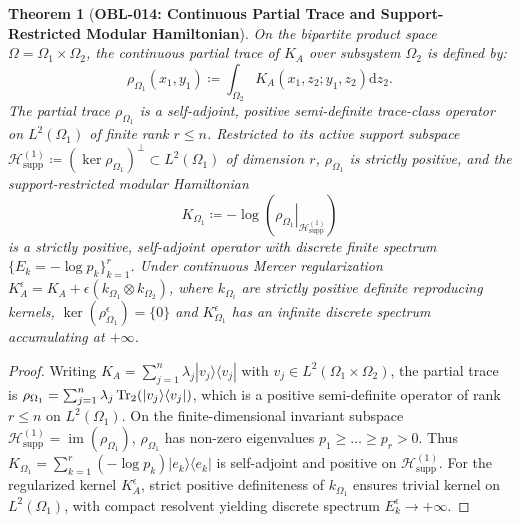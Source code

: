 \documentclass[11pt,a4paper,reqno]{amsart}
\newtheorem{theorem}{Theorem}[section]
\theoremstyle{definition}
\theoremstyle{remark}
\numberwithin{equation}{section}
\newcommand{\dif}{\mathrm{d}}
\DeclareMathOperator{\im}{im}
\begin{document}
\begin{theorem}[\textbf{OBL-014: Continuous Partial Trace and Support-Restricted Modular Hamiltonian}]
\label{thm:modular_hamiltonian_spec}
On the bipartite product space $\Omega = \Omega_1 \times \Omega_2$, the continuous partial trace of $K_A$ over subsystem $\Omega_2$ is defined by:
\begin{equation}
\rho_{\Omega_1}(x_1, y_1) \coloneqq \int_{\Omega_2} K_A(x_1, z_2; y_1, z_2) \dif z_2.
\end{equation}
The partial trace $\rho_{\Omega_1}$ is a self-adjoint, positive semi-definite trace-class operator on $L^2(\Omega_1)$ of finite rank $r \le n$. Restricted to its active support subspace $\mathcal{H}_{\mathrm{supp}}^{(1)} \coloneqq (\ker \rho_{\Omega_1})^\perp \subset L^2(\Omega_1)$ of dimension $r$, $\rho_{\Omega_1}$ is strictly positive, and the support-restricted modular Hamiltonian
\begin{equation}
K_{\Omega_1} \coloneqq -\log\left(\left.\rho_{\Omega_1}\right|_{\mathcal{H}_{\mathrm{supp}}^{(1)}}\right)
\end{equation}
is a strictly positive, self-adjoint operator with discrete finite spectrum $\{E_k = -\log p_k\}_{k=1}^r$. Under continuous Mercer regularization $K_A^\epsilon = K_A + \epsilon (k_{\Omega_1} \otimes k_{\Omega_2})$, where $k_{\Omega_i}$ are strictly positive definite reproducing kernels, $\ker(\rho_{\Omega_1}^\epsilon) = \{0\}$ and $K_{\Omega_1}^\epsilon$ has an infinite discrete spectrum accumulating at $+\infty$.
\end{theorem}

\begin{proof}
Writing $K_A = \sum_{j=1}^n \lambda_j |v_j\rangle\langle v_j|$ with $v_j \in L^2(\Omega_1 \times \Omega_2)$, the partial trace is $\rho_{\Omega_1} = \sum_{j=1}^n \lambda_j \Tr_2(|v_j\rangle\langle v_j|)$, which is a positive semi-definite operator of rank $r \le n$ on $L^2(\Omega_1)$. On the finite-dimensional invariant subspace $\mathcal{H}_{\mathrm{supp}}^{(1)} = \im(\rho_{\Omega_1})$, $\rho_{\Omega_1}$ has non-zero eigenvalues $p_1 \ge \dots \ge p_r > 0$. Thus $K_{\Omega_1} = \sum_{k=1}^r (-\log p_k) |e_k\rangle\langle e_k|$ is self-adjoint and positive on $\mathcal{H}_{\mathrm{supp}}^{(1)}$. For the regularized kernel $K_A^\epsilon$, strict positive definiteness of $k_{\Omega_1}$ ensures trivial kernel on $L^2(\Omega_1)$, with compact resolvent yielding discrete spectrum $E_k^\epsilon \to +\infty$.
\end{proof}
\end{document}
